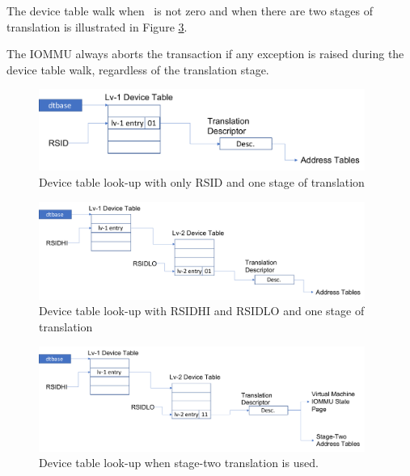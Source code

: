 The device table walk when \rsiddiv\ is not zero and when there are two stages of
translation is illustrated in Figure \ref{fig:dev_tbl_lookup_two_stage}.

The IOMMU always aborts the transaction if any exception is raised during the device table
walk, regardless of the translation stage.

\begin{figure}[h!t]
    \centering
    \includegraphics[width=0.95\textwidth]{img/dev_tbl_lookup_short_rsid.pdf}
    \caption{Device table look-up with only RSID and one stage of translation}
    \label{fig:dev_tbl_lookup_rsid_short}
\end{figure}

\begin{figure}[h!t]
    \centering
    \includegraphics[width=0.95\textwidth]{img/dev_tbl_lookup_bare.pdf}
    \caption{Device table look-up with RSIDHI and RSIDLO and one stage of translation}
    \label{fig:dev_tbl_lookup_bare}
\end{figure}

\begin{figure}[h!t]
    \centering
    \includegraphics[width=0.95\textwidth]{img/dev_tbl_lookup_two_stage.pdf}
    \caption{Device table look-up when stage-two translation is used.}
    \label{fig:dev_tbl_lookup_two_stage}
\end{figure}

